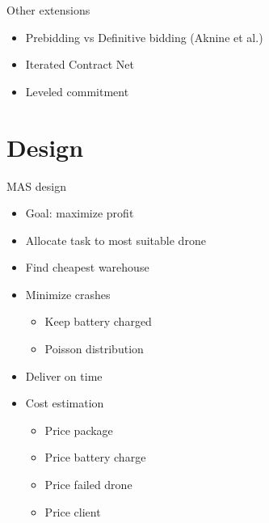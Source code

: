 \documentclass{beamer}
\begin{document}
	\begin{frame}{Other extensions}
		\begin{itemize}
			\item Prebidding vs Definitive bidding (Aknine et al.)
			\item Iterated Contract Net
			\item Leveled commitment
		\end{itemize}
	\end{frame}
	
	\section{Design}
	
	\begin{frame}{MAS design}
		\begin{itemize}
			\item Goal: maximize profit
			\item Allocate task to most suitable drone
			\item Find cheapest warehouse
			\item Minimize crashes
			\begin{itemize}
				\item Keep battery charged
				\item Poisson distribution
			\end{itemize}
			\item Deliver on time
			\item Cost estimation
				\begin{itemize}
				\item Price package
				\item Price battery charge
				\item Price failed drone
				\item Price client
				\end{itemize}
		\end{itemize}
	\end{frame}
	
\end{document}

